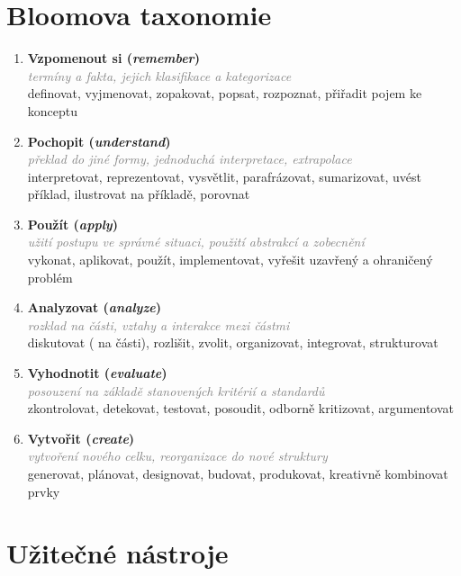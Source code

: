 \documentclass[twoside,openany,10pt]{book}
\newcommand{\note}[1]{\textcolor{gray}{\small\itshape #1}}
\begin{document}
\chapter*{Bloomova taxonomie}
\label{bloom}

\begin{enumerate}[leftmargin=*]
\item \textbf{Vzpomenout si (\textit{remember})}\\
\note{termíny a fakta, jejich klasifikace a kategorizace}\\
{\small definovat, vyjmenovat, zopakovat, popsat, rozpoznat, přiřadit pojem ke konceptu}

\item \textbf{Pochopit (\textit{understand})}\\
\note{překlad do jiné formy, jednoduchá interpretace, extrapolace}\\
{\small interpretovat, reprezentovat, vysvětlit, parafrázovat, sumarizovat, uvést příklad, ilustrovat na příkladě, porovnat}

\item \textbf{Použít (\textit{apply})}\\
\note{užití postupu ve správné situaci, použití abstrakcí a zobecnění}\\
{\small vykonat, aplikovat, použít, implementovat, vyřešit uzavřený a ohraničený problém}

\item \textbf{Analyzovat (\textit{analyze})}\\
\note{rozklad na části, vztahy a interakce mezi částmi}\\
{\small diskutovat ( na části), rozlišit, zvolit, organizovat, integrovat, strukturovat}

\item \textbf{Vyhodnotit (\textit{evaluate})}\\
\note{posouzení na základě stanovených kritérií a standardů}\\
{\small zkontrolovat, detekovat, testovat, posoudit, odborně kritizovat, argumentovat}

\item \textbf{Vytvořit (\textit{create})}\\
\note{vytvoření nového celku, reorganizace do nové struktury}\\
{\small generovat, plánovat, designovat, budovat, produkovat, kreativně kombinovat prvky}
\end{enumerate}

\chapter*{Užitečné nástroje}
\end{document}
